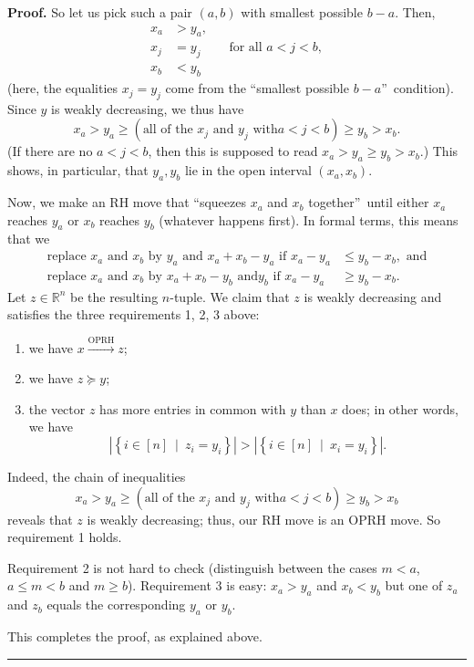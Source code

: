 \documentclass[numbers=enddot,12pt,final,onecolumn,notitlepage]{scrartcl}%
\numberwithin{exer}{subsection}
\theoremstyle{definition}
\newenvironment{proof}[1][Proof]{\noindent\textbf{#1.} }{\ \rule{0.5em}{0.5em}}
\begin{document}
\begin{proof}
So let us pick such a pair $\left(  a,b\right)  $ with smallest possible
$b-a$. Then,%
\begin{align*}
x_{a}  & >y_{a},\\
x_{j}  & =y_{j}\ \ \ \ \ \ \ \ \ \ \text{for all }a<j<b,\\
x_{b}  & <y_{b}%
\end{align*}
(here, the equalities $x_{j}=y_{j}$ come from the \textquotedblleft smallest
possible $b-a$\textquotedblright\ condition). Since $y$ is weakly decreasing,
we thus have%
\[
x_{a}>y_{a}\geq\left(  \text{all of the }x_{j}\text{ and }y_{j}\text{ with
}a<j<b\right)  \geq y_{b}>x_{b}.
\]
(If there are no $a<j<b$, then this is supposed to read $x_{a}>y_{a}\geq
y_{b}>x_{b}$.) This shows, in particular, that $y_{a},y_{b}$ lie in the open
interval $\left(  x_{a},x_{b}\right)  $.

Now, we make an RH move that \textquotedblleft squeezes $x_{a}$ and $x_{b}$
together\textquotedblright\ until either $x_{a}$ reaches $y_{a}$ or $x_{b}$
reaches $y_{b}$ (whatever happens first). In formal terms, this means that we
\begin{align*}
\text{replace }x_{a}\text{ and }x_{b}\text{ by }y_{a}\text{ and }x_{a}%
+x_{b}-y_{a}\text{ if }x_{a}-y_{a}  & \leq y_{b}-x_{b},\text{ and}\\
\text{replace }x_{a}\text{ and }x_{b}\text{ by }x_{a}+x_{b}-y_{b}\text{ and
}y_{b}\text{ if }x_{a}-y_{a}  & \geq y_{b}-x_{b}.
\end{align*}
Let $z\in\mathbb{R}^{n}$ be the resulting $n$-tuple. We claim that $z$ is
weakly decreasing and satisfies the three requirements 1, 2, 3 above:

\begin{enumerate}
\item we have $x\overset{\text{OPRH}}{\longrightarrow}z$;

\item we have $z\succcurlyeq y$;

\item the vector $z$ has more entries in common with $y$ than $x$ does; in
other words, we have%
\[
\left\vert \left\{  i\in\left[  n\right]  \ \mid\ z_{i}=y_{i}\right\}
\right\vert >\left\vert \left\{  i\in\left[  n\right]  \ \mid\ x_{i}%
=y_{i}\right\}  \right\vert .
\]

\end{enumerate}

Indeed, the chain of inequalities%
\[
x_{a}>y_{a}\geq\left(  \text{all of the }x_{j}\text{ and }y_{j}\text{ with
}a<j<b\right)  \geq y_{b}>x_{b}%
\]
reveals that $z$ is weakly decreasing; thus, our RH move is an OPRH move. So
requirement 1 holds.

Requirement 2 is not hard to check (distinguish between the cases $m<a$,
$a\leq m<b$ and $m\geq b$). Requirement 3 is easy: $x_{a}>y_{a}$ and
$x_{b}<y_{b}$ but one of $z_{a}$ and $z_{b}$ equals the corresponding $y_{a}$
or $y_{b}$.

This completes the proof, as explained above.
\end{proof}
\end{document}

